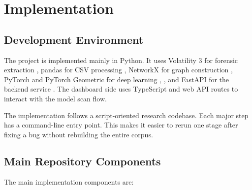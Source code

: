 \chapter{Implementation}
\label{ch:implementation}

\section{Development Environment}

The project is implemented mainly in Python. It uses Volatility 3 for forensic extraction \cite{volatility3docs}, pandas for CSV processing \cite{mckinney2010pandas}, NetworkX for graph construction \cite{hagberg2008networkx}, PyTorch and PyTorch Geometric for deep learning \cite{paszke2019pytorch}, \cite{fey2019pyg}, and FastAPI for the backend service \cite{fastapi2026docs}. The dashboard side uses TypeScript and web API routes to interact with the model scan flow.

The implementation follows a script-oriented research codebase. Each major step has a command-line entry point. This makes it easier to rerun one stage after fixing a bug without rebuilding the entire corpus.

\section{Main Repository Components}

The main implementation components are:

